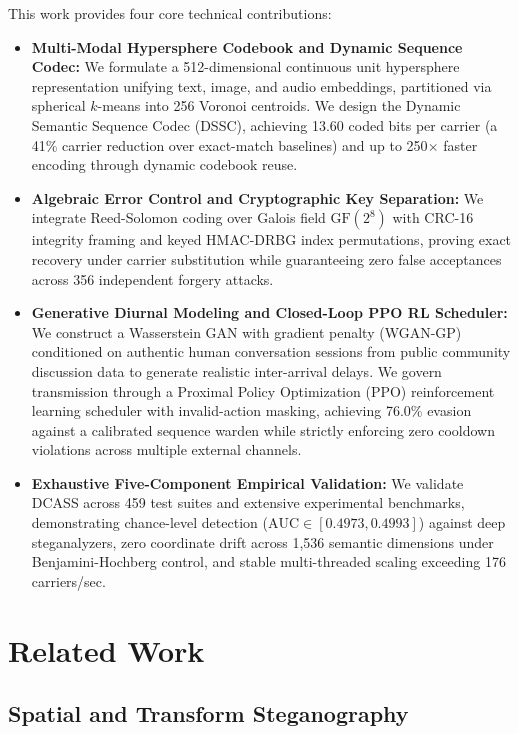 \documentclass[conference]{IEEEtran}
\begin{document}
This work provides four core technical contributions:
\begin{itemize}
    \item \textbf{Multi-Modal Hypersphere Codebook and Dynamic Sequence Codec:} We formulate a 512-dimensional continuous unit hypersphere representation unifying text, image, and audio embeddings, partitioned via spherical $k$-means into 256 Voronoi centroids. We design the Dynamic Semantic Sequence Codec (DSSC), achieving 13.60 coded bits per carrier (a 41\% carrier reduction over exact-match baselines) and up to 250$\times$ faster encoding through dynamic codebook reuse.
    \item \textbf{Algebraic Error Control and Cryptographic Key Separation:} We integrate Reed-Solomon coding over Galois field $\text{GF}(2^8)$ with CRC-16 integrity framing and keyed HMAC-DRBG index permutations, proving exact recovery under carrier substitution while guaranteeing zero false acceptances across 356 independent forgery attacks.
    \item \textbf{Generative Diurnal Modeling and Closed-Loop PPO RL Scheduler:} We construct a Wasserstein GAN with gradient penalty (WGAN-GP) conditioned on authentic human conversation sessions from public community discussion data to generate realistic inter-arrival delays. We govern transmission through a Proximal Policy Optimization (PPO) reinforcement learning scheduler with invalid-action masking, achieving 76.0\% evasion against a calibrated sequence warden while strictly enforcing zero cooldown violations across multiple external channels.
    \item \textbf{Exhaustive Five-Component Empirical Validation:} We validate DCASS across 459 test suites and extensive experimental benchmarks, demonstrating chance-level detection ($\text{AUC} \in [0.4973, 0.4993]$) against deep steganalyzers, zero coordinate drift across 1,536 semantic dimensions under Benjamini-Hochberg control, and stable multi-threaded scaling exceeding 176 carriers/sec.
\end{itemize}

\section{Related Work}

\subsection{Spatial and Transform Steganography}
\end{document}
